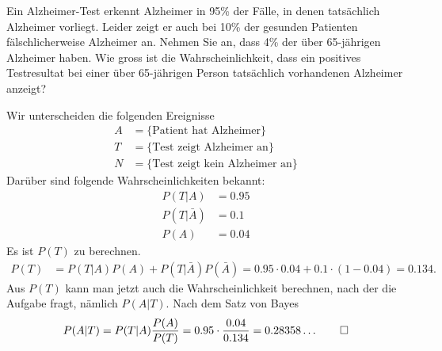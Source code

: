 Ein Alzheimer-Test erkennt Alzheimer in 95\% der Fälle, in denen tatsächlich
Alzheimer vorliegt. Leider zeigt er auch bei 10\% der gesunden Patienten
fälschlicherweise Alzheimer an. Nehmen Sie an, dass 4\% der über 65-jährigen
Alzheimer haben.
Wie gross ist die Wahrscheinlichkeit, dass ein positives Testresultat bei
einer über 65-jährigen Person tatsächlich vorhandenen Alzheimer anzeigt?


\begin{loesung}
Wir unterscheiden die folgenden Ereignisse
\begin{align*}
A&=\{\text{Patient hat Alzheimer}\}
\\
T&=\{\text{Test zeigt Alzheimer an}\}
\\
N&=\{\text{Test zeigt kein Alzheimer an}\}
\end{align*}
Darüber sind folgende Wahrscheinlichkeiten bekannt:
\begin{align*}
P(T|A)&=0.95\\
P(T|\bar A)&=0.1\\
P(A)&=0.04
\end{align*}
Es ist $P(T)$ zu berechnen.
\begin{align*}
P(T)&=P(T|A)P(A)+P(T|\bar A)P(\bar A)=0.95\cdot 0.04 + 0.1\cdot (1-0.04)
=0.134.
\end{align*}
Aus $P(T)$ kann man jetzt auch die Wahrscheinlichkeit berechnen, nach
der die Aufgabe fragt, nämlich $P(A|T)$.
Nach dem Satz von Bayes
\[
P(A|T)
=
P(T|A) \frac{P(A)}{P(T)}
=
0.95\cdot\frac{0.04}{0.134}
=
0.28358\dots
\qedhere
\]
\end{loesung}

